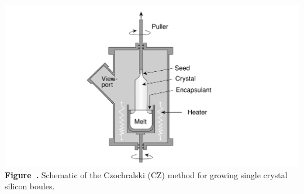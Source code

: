 \begin{center}
	\begin{minipage}{0.8\textwidth}
		\centering
		\includegraphics[width=\textwidth]{img/Czochralski.png}
		\\[0.5em]
		\textbf{Figure~\thefigure.} Schematic of the Czochralski (CZ) method for growing single crystal silicon boules.
		\label{fig:CZ}
	\end{minipage}
\end{center}


